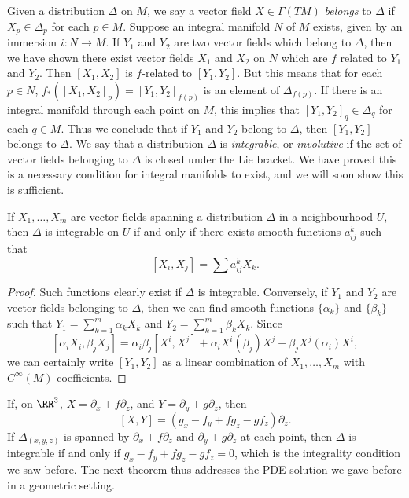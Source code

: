 Given a distribution $\Delta$ on $M$, we say a vector field $X \in \Gamma(TM)$ \emph{belongs} to $\Delta$ if $X_p \in \Delta_p$ for each $p \in M$. Suppose an integral manifold $N$ of $M$ exists, given by an immersion $i: N \to M$. If $Y_1$ and $Y_2$ are two vector fields which belong to $\Delta$, then we have shown there exist vector fields $X_1$ and $X_2$ on $N$ which are $f$ related to $Y_1$ and $Y_2$. Then $[X_1,X_2]$ is $f$-related to $[Y_1,Y_2]$. But this means that for each $p \in N$, $f_*([X_1,X_2]_p) = [Y_1,Y_2]_{f(p)}$ is an element of $\Delta_{f(p)}$. If there is an integral manifold through each point on $M$, this implies that $[Y_1,Y_2]_q \in \Delta_q$ for each $q \in M$. Thus we conclude that if $Y_1$ and $Y_2$ belong to $\Delta$, then $[Y_1,Y_2]$ belongs to $\Delta$. We say that a distribution $\Delta$ is \emph{integrable}, or \emph{involutive} if the set of vector fields belonging to $\Delta$ is closed under the Lie bracket. We have proved this is a necessary condition for integral manifolds to exist, and we will soon show this is sufficient.

\begin{lemma}
    If $X_1, \dots, X_m$ are vector fields spanning a distribution $\Delta$ in a neighbourhood $U$, then $\Delta$ is integrable on $U$ if and only if there exists smooth functions $a_{ij}^k$ such that
    \[ [X_i,X_j] = \sum a_{ij}^k X_k. \]
\end{lemma}
\begin{proof}
    Such functions clearly exist if $\Delta$ is integrable. Conversely, if $Y_1$ and $Y_2$ are vector fields belonging to $\Delta$, then we can find smooth functions $\{ \alpha_k \}$ and $\{ \beta_k \}$ such that $Y_1 = \sum_{k = 1}^m \alpha_k X_k$ and $Y_2 = \sum_{k = 1}^m \beta_k X_k$. Since
    \[ [\alpha_i X_i, \beta_j X_j] = \alpha_i \beta_j [X^i,X^j] + \alpha_i X^i(\beta_j) X^j - \beta_j X^j(\alpha_i) X^i, \]
    we can certainly write $[Y_1,Y_2]$ as a linear combination of $X_1, \dots, X_m$ with $C^\infty(M)$ coefficients.
\end{proof}

\begin{remark}
    If, on $\RR^3$, $X = \partial_x + f \partial_z$, and $Y = \partial_y + g \partial_z$, then
    \[ [X,Y] = \left( g_x - f_y + fg_z - g f_z \right) \partial_z. \]
    If $\Delta_{(x,y,z)}$ is spanned by $\partial_x + f \partial_z$ and $\partial_y + g \partial_z$ at each point, then $\Delta$ is integrable if and only if $g_x - f_y + fg_z - gf_z = 0$, which is the integrality condition we saw before. The next theorem thus addresses the PDE solution we gave before in a geometric setting.
\end{remark}

